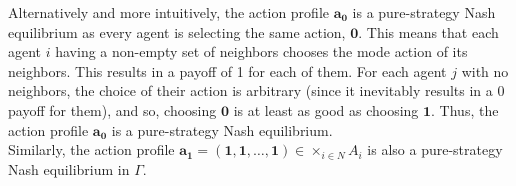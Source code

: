 \documentclass[9pt]{article}
\begin{document}
Alternatively and more intuitively, the action profile $\textbf{a}_{\textbf{0}}$ is a pure-strategy Nash equilibrium as every agent is selecting the same action, $\textbf{0}$.
This means that each agent $i$ having a non-empty set of neighbors chooses the mode action of its neighbors.
This results in a payoff of 1 for each of them.
For each agent $j$ with no neighbors, the choice of their action is arbitrary (since it inevitably results in a 0 payoff for them), and so, choosing $\textbf{0}$ is at least as good as choosing $\textbf{1}$.
Thus, the action profile $\textbf{a}_{\textbf{0}}$ is a pure-strategy Nash equilibrium. \\
Similarly, the action profile $\textbf{a}_{\textbf{1}} = (\textbf{1}, \textbf{1}, \dots, \textbf{1}) \in \times_{i \in N} A_{i}$ is also a pure-strategy Nash equilibrium in $\Gamma$.
\end{document}
